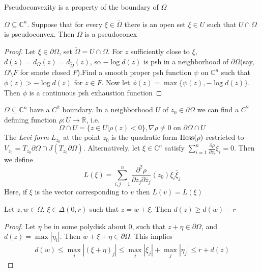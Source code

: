 \documentclass[../main.tex]{subfiles}
\begin{document}
Pseudoconvexity is a property of the boundary of $\Omega$

\begin{proposition}
$\Omega\subseteq\mathbb C^n$. Suppose that for every $\xi\in\overline\Omega$ there is an open set $\xi\in U$ such that $U\cap\Omega$ is pseudoconvex. Then $\Omega$ is a pseudoconex
\end{proposition}

\begin{proof}
Let $\xi\in\partial\Omega$, set $\tilde\Omega=U\cap\Omega$. For $z$ sufficiently close to $\xi$, $d(z)=d_{\Omega}(z)=d_{\tilde\Omega}(z)$, so $-\log d(z)$ is psh in a neighborhood of $\partial\Omega$(say, $\Omega\setminus F$ for smote closed $F$).Find a smooth proper psh function $\psi$ on $\mathbb C^n$ such that $\phi(z)>-\log d(z)$ for $z\in F$. Now let $\phi(z)=\max\{\psi(z),-\log d(z)\}$. Then $\phi$ is a continuous psh exhaustion function
\end{proof}

\begin{definition}
$\Omega\subseteq\mathbb C^n$ have a $C^2$ boundary. In a neighborhood $U$ of $z_0\in\partial\Omega$ we can find a $C^2$ defining function $\rho:U\to\mathbb R$, i.e.
\[\Omega\cap U=\{z\in U|\rho(z)<0\},\nabla\rho\neq0\text{ on }\partial\Omega\cap U\]
The \textit{Levi form} $L_{z_0}$ at the point $z_0$ is the quadratic form $\operatorname{Hess}(\rho)$ restricted to $V_{z_0}=T_{z_0}\partial\Omega\cap J(T_{z_0}\partial\Omega)$. Alternatively, let $\xi\in\mathbb C^n$ satisfy $\sum_{i=1}^n\frac{\partial\rho}{\partial z_i}\xi_i=0$. Then we define
\[L(\xi)=\sum_{i,j=1}^n\frac{\partial^2\rho}{\partial z_j\partial \bar z_j}(z_0)\xi_i\bar\xi_j\]
Here, if $\xi$ is the vector corresponding to $v$ then $L(v)=L(\xi)$
\end{definition}

\begin{lemma}\label{d(z)>=d(w)-r}
Let $z,w\in \Omega$, $\xi\in\Delta(0,r)$ such that $z=w+\xi$. Then $d(z)\geq d(w)-r$
\end{lemma}

\begin{proof}
Let $\eta$ be in some polydisk about $0$, such that $z+\eta\in\partial\Omega$, and $d(z)=\max|\eta_i|$. Then $w+\xi+\eta\in\partial\Omega$. This implies
\begin{align*}
d(w)\leq\max_j|(\xi+\eta)_j|\leq\max_j|\xi_j|+\max_j|\eta_j|\leq r+d(z)
\end{align*}
\end{proof}
\end{document}
